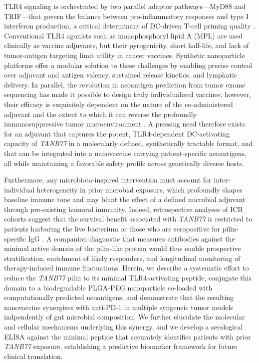 \documentclass{article}
\begin{document}
TLR4 signaling is orchestrated by two parallel adaptor pathways—MyD88 and TRIF—that govern the balance between pro-inflammatory responses and type I interferon production, a critical determinant of DC-driven T-cell priming quality \cite{ref:tlr4_pathways}. Conventional TLR4 agonists such as monophosphoryl lipid A (MPL) are used clinically as vaccine adjuvants, but their pyrogenicity, short half-life, and lack of tumor-antigen targeting limit utility in cancer vaccines. Synthetic nanoparticle platforms offer a modular solution to these challenges by enabling precise control over adjuvant and antigen valency, sustained release kinetics, and lymphatic delivery. In parallel, the revolution in neoantigen prediction from tumor exome sequencing has made it possible to design truly individualized vaccines; however, their efficacy is exquisitely dependent on the nature of the co-administered adjuvant and the extent to which it can reverse the profoundly immunosuppressive tumor microenvironment \cite{ref:neoantigen_vaccine_challenges}. A pressing need therefore exists for an adjuvant that captures the potent, TLR4-dependent DC-activating capacity of \textit{TANB77} in a molecularly defined, synthetically tractable format, and that can be integrated into a nanovaccine carrying patient-specific neoantigens, all while maintaining a favorable safety profile across genetically diverse hosts.

Furthermore, any microbiota-inspired intervention must account for inter-individual heterogeneity in prior microbial exposure, which profoundly shapes baseline immune tone and may blunt the effect of a defined microbial adjuvant through pre-existing humoral immunity. Indeed, retrospective analyses of ICB cohorts suggest that the survival benefit associated with \textit{TANB77} is restricted to patients harboring the live bacterium or those who are seropositive for pilin-specific IgG \cite{ref:serology_cohort}. A companion diagnostic that measures antibodies against the minimal active domain of the pilin-like protein would thus enable prospective stratification, enrichment of likely responders, and longitudinal monitoring of therapy-induced immune fluctuations. Herein, we describe a systematic effort to reduce the \textit{TANB77} pilin to its minimal TLR4-activating peptide, conjugate this domain to a biodegradable PLGA-PEG nanoparticle co-loaded with computationally predicted neoantigens, and demonstrate that the resulting nanovaccine synergizes with anti-PD-1 in multiple syngeneic tumor models indpendently of gut microbial composition. We further elucidate the molecular and cellular mechanisms underlying this synergy, and we develop a serological ELISA against the minimal peptide that accurately identifies patients with prior \textit{TANB77} exposure, establishing a predictive biomarker framework for future clinical translation.
\end{document}
